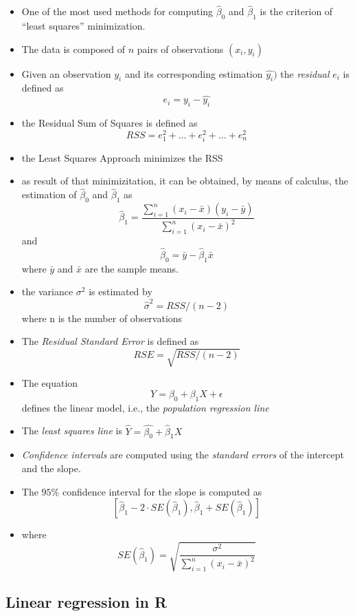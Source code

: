 \documentclass[]{book}
\providecommand{\tightlist}{%
  \setlength{\itemsep}{0pt}\setlength{\parskip}{0pt}}
\begin{document}
\begin{itemize}
\tightlist
\item
  One of the most used methods for computing \(\hat{\beta}_0\) and
  \(\hat{\beta}_1\) is the criterion of ``least squares'' minimization.
\item
  The data is composed of \(n\) pairs of observations \((x_i, y_i)\)
\item
  Given an observation \(y_i\) and its corresponding estimation
  \(\hat{y_i})\) the \emph{residual} \(e_i\) is defined as
  \[e_i= y_i - \hat{y_i}\]
\item
  the Residual Sum of Squares is defined as
  \[RSS=e_1^2+\dots + e_i^2+\dots+e_n^2\]
\item
  the Least Squares Approach minimizes the RSS
\item
  as result of that minimizitation, it can be obtained, by means of
  calculus, the estimation of \(\hat{\beta}_0\) and \(\hat{\beta}_1\) as
  \[\hat{\beta}_1=\frac{\sum_{i=1}^{n}{(x_i-\bar{x})(y_i-\bar{y})}}{\sum_{i=1}^{n}(x_i-\bar{x})^2}\]
  and \[\hat{\beta}_0=\bar{y}-\hat{\beta}_1\bar{x} \] where \(\bar{y}\)
  and \(\bar{x}\) are the sample means.
\item
  the variance \(\sigma^2\) is estimated by
  \[\hat\sigma^2 = {RSS}/{(n-2)}\] where n is the number of observations
\item
  The \emph{Residual Standard Error} is defined as
  \[RSE = \sqrt{{RSS}/{(n-2)}}\]
\item
  The equation \[ Y = \beta_0 + \beta_1 X + \epsilon\] defines the
  linear model, i.e., the \emph{population regression line}
\item
  The \emph{least squares line} is
  \(\hat{Y}=\hat{\beta_0} + \hat{\beta}_1X\)
\item
  \emph{Confidence intervals} are computed using the \emph{standard
  errors} of the intercept and the slope.
\item
  The \(95\%\) confidence interval for the slope is computed as
  \[[\hat{\beta}_1 - 2 \cdot SE(\hat{\beta}_1), \hat{\beta}_1+SE(\hat{\beta}_1)]\]
\item
  where
  \[ SE(\hat{\beta}_1) = \sqrt{\frac{\sigma^2}{\sum_{i=1}^{n}(x_i-\bar{x})^2}}\]
\end{itemize}

\subsection{Linear regression in R}\label{linear-regression-in-r}
\end{document}
